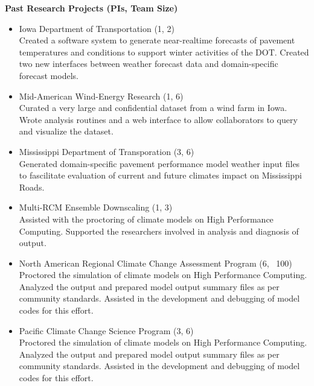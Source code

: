 \vspace*{0.25in}
\Large \bf Past Research Projects (PIs, Team Size)
\normalsize \sf
\begin{itemize}
\item Iowa Department of Transportation (1, 2)\\
Created a software system to generate near-realtime forecasts of pavement
temperatures and conditions to support winter activities of the DOT.  Created
two new interfaces between weather forecast data and domain-specific forecast
models.
\item Mid-American Wind-Energy Research (1, 6)\\
Curated a very large and confidential dataset from a wind farm in Iowa. Wrote
analysis routines and a web interface to allow collaborators to query and
visualize the dataset.
\item Mississippi Department of Transporation (3, 6)\\
Generated domain-specific pavement performance model weather input files
to fascilitate evaluation of current and future climates impact on 
Mississippi Roads.
\item Multi-RCM Ensemble Downscaling (1, 3)\\
Assisted with the proctoring of climate models on High Performance Computing.
Supported the researchers involved in analysis and diagnosis of output.
\item North American Regional Climate Change Assessment Program (6, ~100)\\
Proctored the simulation of climate models on High Performance Computing.
 Analyzed the output and prepared model output summary files as per 
community standards.  Assisted in the development and debugging of model
codes for this effort.
\item Pacific Climate Change Science Program (3, 6)\\
Proctored the simulation of climate models on High Performance Computing.
 Analyzed the output and prepared model output summary files as per 
community standards.  Assisted in the development and debugging of model
codes for this effort.
\end{itemize}



